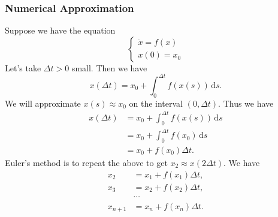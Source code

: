 \documentclass[class=article, crop=false]{standalone}
\begin{document}
  \subsubsection{Numerical Approximation}
  Suppose we have the equation 
  \[
    \begin{cases}
      \dot{x} = f(x) \\
      x(0) = x_0
    \end{cases}
  \]
  Let's take $\Delta t > 0$ small. Then we have
  \[
    x(\Delta t) = x_0 + \int_{0}^{\Delta t}f(x(s)) \,\mathrm ds.
  \]
  We will approximate $x(s) \approx x_0$ on the interval $(0, \Delta t)$. Thus we have
  \begin{align*}
    x(\Delta t) &= x_0 + \int_{0}^{\Delta t}f(x(s)) \,\mathrm ds \\
                &= x_0 + \int_{0}^{\Delta t}f(x_0) \,\mathrm ds \\
                &= x_0 + f(x_0)\Delta t \tag{$x_1\ceq x_0 + f(x_0)\Delta t$}.
  \end{align*}
  Euler's method is to repeat the above to get $x_2\approx x(2\Delta t)$. We have
  \begin{align*}
    x_2 &= x_1 + f(x_1)\Delta t, \\
    x_3 &= x_2 + f(x_2)\Delta t, \\
        &\dotsb \\
    x_{n + 1} &= x_n + f(x_n)\Delta t.
  \end{align*}
\end{document}
